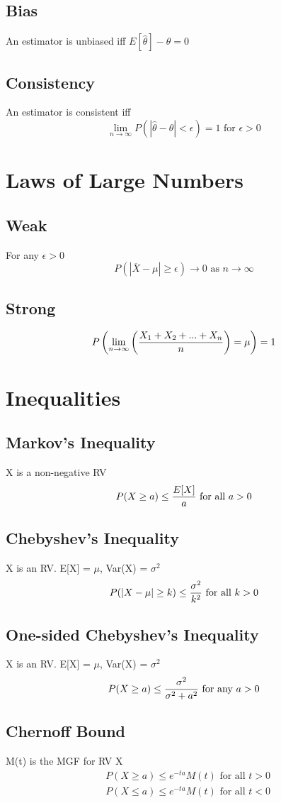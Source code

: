 \documentclass[12pt]{amsart}
\begin{document}
\subsection{Bias}
An estimator is unbiased iff $E[\hat{\theta}] - \theta = 0$
\subsection{Consistency}
An estimator is consistent iff
\[
\lim_{n \to \infty} P(\left| \hat{\theta} - \theta \right| < \epsilon) = 1 \text{ for } \epsilon > 0
\]
\section{Laws of Large Numbers}
\subsection{Weak}
For any $\epsilon > 0$
\[
P(\left| \overline{X} - \mu \right| \geq \epsilon) \to 0 \text{ as } n \to \infty
\]
\subsection{Strong}
\[
P\left( \lim_{n\to\infty} \left( X_1 + X_2 + ... + X_n \over n \right) = \mu \right) = 1
\]
\section{Inequalities}
\subsection{Markov's Inequality}
X is a non-negative RV
\[
P(X \geq a) \leq {E[X] \over a} \text{ for all } a > 0
\]
\subsection{Chebyshev's Inequality}
X is an RV. E[X] = $\mu$, Var(X) = $\sigma^2$
\[
P(\left|X - \mu\right| \geq k) \leq {\sigma^2 \over k^2} \text{ for all } k > 0
\]
\subsection{One-sided Chebyshev's Inequality}
X is an RV. E[X] = $\mu$, Var(X) = $\sigma^2$
\[
P(X \geq a) \leq {\sigma^2 \over \sigma^2 + a^2} \text{ for any } a > 0
\]
\subsection{Chernoff Bound}
M(t) is the MGF for RV X
\begin{align*}
&P(X \geq a) \leq e^{-ta} M(t) \text{ for all } t > 0 \\
&P(X \leq a) \leq e^{-ta} M(t) \text{ for all } t < 0
\end{align*}
\end{document}
